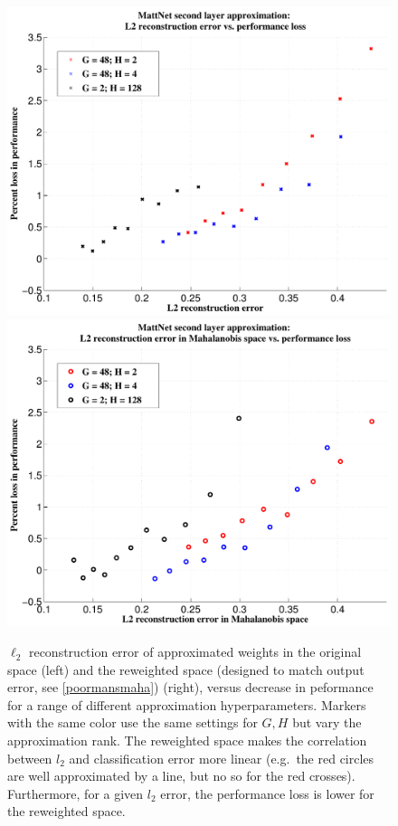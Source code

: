 %
\begin{figure}[h]
\centering
\begin{minipage}{0.75\textwidth}
  \includegraphics[width=0.5\linewidth]{img/biclustering_L2_vs_testerr_matt.pdf} 
\quad\quad
  \includegraphics[width=0.5\linewidth]{img/biclustering_L2_vs_testerr_maha_matt.pdf} 
\end{minipage}
\vspace{-3mm}
\caption{$\ell_2$ reconstruction error of approximated weights in the
  original space (left) and the reweighted space (designed to match
  output error, see
  \ref{poormansmaha}) (right), versus decrease in peformance for a
  range of different approximation hyperparameters. Markers with the
  same color use the same settings for $G,H$ but vary the
  approximation rank. The reweighted space makes the correlation
  between $l_2$ and classification error more linear (e.g.~the red
  circles are well approximated by a line, but no so for the red
  crosses). Furthermore, for a given $l_2$ error, the performance loss
  is lower for the reweighted space. }
\label{fig:components}
\end{figure}
%

